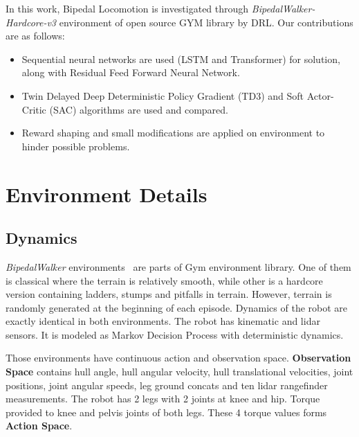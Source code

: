 \documentclass[a4paper, 12pt]{article} %
\begin{document}
In this work, Bipedal Locomotion is investigated through \textit{BipedalWalker-Hardcore-v3} \cite{noauthor_bipedalwalkerhardcore-v2_2021} environment of open source GYM library \cite{brockman_openai_2016} by DRL. 
Our contributions are as follows:
\begin{itemize}
	\item Sequential neural networks are used (LSTM and Transformer) for solution, along with Residual Feed Forward Neural Network.
	\item Twin Delayed Deep Deterministic Policy Gradient (TD3) and Soft Actor-Critic (SAC) algorithms are used and compared.
	\item Reward shaping and small modifications are applied on environment to hinder possible problems.
\end{itemize}

\section{Environment Details}

\subsection{Dynamics}

\textit{BipedalWalker} environments~\cite{noauthor_bipedalwalker-v2_2021, noauthor_bipedalwalkerhardcore-v2_2021} are parts of Gym environment library. 
One of them is classical where the terrain is relatively smooth, while other is a hardcore version containing ladders, stumps and pitfalls in terrain. 
However, terrain is randomly generated at the beginning of each episode.
Dynamics of the robot are exactly identical in both environments. 
The robot has kinematic and lidar sensors. 
It is modeled as Markov Decision Process with deterministic dynamics.

Those environments have continuous action and observation space. 
\textbf{Observation Space} contains hull angle, hull angular velocity, hull translational velocities, joint positions, joint angular speeds, leg ground concats and ten lidar rangefinder measurements.
The robot has 2 legs with 2 joints at knee and hip. Torque provided to knee and pelvis joints of both legs. These 4 torque values forms  \textbf{Action Space}.
\end{document}
